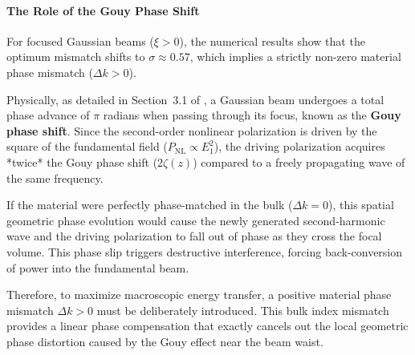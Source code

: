 \begin{resolucao}[Solution]
        \paragraph*{The Role of the Gouy Phase Shift}
            For focused Gaussian beams ($\xi > 0$), the numerical results show that the optimum mismatch shifts to $\sigma \approx 0.57$, which implies a strictly non-zero material phase mismatch ($\Delta k > 0$). 
            
            Physically, as detailed in Section~3.1 of , a Gaussian beam undergoes a total phase advance of $\pi$ radians when passing through its focus, known as the \textbf{Gouy phase shift}. Since the second-order nonlinear polarization is driven by the square of the fundamental field ($P_{\mathrm{NL}} \propto E_1^2$), the driving polarization acquires *twice* the Gouy phase shift ($2\zeta(z)$) compared to a freely propagating wave of the same frequency.
        
            If the material were perfectly phase-matched in the bulk ($\Delta k = 0$), this spatial geometric phase evolution would cause the newly generated second-harmonic wave and the driving polarization to fall out of phase as they cross the focal volume. This phase slip triggers destructive interference, forcing back-conversion of power into the fundamental beam. 
            
            Therefore, to maximize macroscopic energy transfer, a positive material phase mismatch $\Delta k > 0$ must be deliberately introduced. This bulk index mismatch provides a linear phase compensation that exactly cancels out the local geometric phase distortion caused by the Gouy effect near the beam waist.

\end{resolucao}
